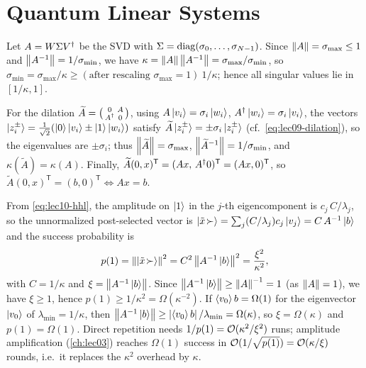 \chapter{Quantum Linear Systems}

\begin{solution}
Let $A=W\Sigma V^{\dagger}$ be the SVD with $\Sigma=\operatorname{diag}(\sigma_0,\dots,\sigma_{N-1})$. Since
$\left\lVert A \right\rVert=\sigma_{\max}\le1$ and $\left\lVert A^{-1} \right\rVert=1/\sigma_{\min}$, we have
$\kappa=\left\lVert A \right\rVert\left\lVert A^{-1} \right\rVert=\sigma_{\max}/\sigma_{\min}$, so $\sigma_{\min}
=\sigma_{\max}/\kappa\ge(\text{after rescaling }\sigma_{\max}=1)\ 1/\kappa$; hence all
singular values lie in $[1/\kappa,1]$.

For the dilation $\widetilde A=\bigl(\begin{smallmatrix}0&A\\ A^{\dagger}&0\end{smallmatrix}
\bigr)$, using $A\ket{v_i}=\sigma_i\ket{w_i}$, $A^{\dagger}\ket{w_i}=\sigma_i\ket{v_i}$, the
vectors $\ket{z_i^\pm}=\tfrac1{\sqrt2}(\ket0\ket{v_i}\pm\ket1\ket{w_i})$ satisfy
$\widetilde A\ket{z_i^\pm}=\pm\sigma_i\ket{z_i^\pm}$ (cf.\ \eqref{eq:lec09-dilation}), so
the eigenvalues are $\pm\sigma_i$; thus $\left\lVert \widetilde A \right\rVert=\sigma_{\max}$,
$\left\lVert \widetilde A^{-1} \right\rVert=1/\sigma_{\min}$, and $\kappa(\widetilde A)=\kappa(A)$.
Finally, $\widetilde A(0,x)^{\mathsf T}=(Ax,\,A^{\dagger} 0)^{\mathsf T}=(Ax,0)^{\mathsf T}$, so
$\widetilde A(0,x)^{\mathsf T}=(b,0)^{\mathsf T}\iff Ax=b$.
\end{solution}

\begin{solution}
From \eqref{eq:lec10-hhl}, the amplitude on $\ket1$ in the $j$-th eigencomponent is
$c_j\,C/\lambda_j$, so the unnormalized post-selected vector is
$\ket{\tilde x\!\succ}=\sum_j (C/\lambda_j)c_j\ket{v_j}=C\,A^{-1}\ket b$ and the success
probability is
\[
  p(1)=\left\lVert \ket{\tilde x\!\succ} \right\rVert^2=C^2\left\lVert A^{-1}\ket b \right\rVert^2
      =\frac{\xi^2}{\kappa^2},
\]
with $C=1/\kappa$ and $\xi=\left\lVert A^{-1}\ket b \right\rVert$. Since $\left\lVert A^{-1}\ket b \right\rVert\ge
\left\lVert A \right\rVert^{-1}=1$ (as $\left\lVert A \right\rVert=1$), we have $\xi\ge1$, hence $p(1)\ge1/\kappa^2
=\Omega(\kappa^{-2})$. If $\braket{v_0}{b}=\Omega(1)$ for the eigenvector $\ket{v_0}$ of
$\lambda_{\min}=1/\kappa$, then $\left\lVert A^{-1}\ket b \right\rVert\ge\left\lvert \braket{v_0}{b} \right\rvert/\lambda_{\min}
=\Omega(\kappa)$, so $\xi=\Omega(\kappa)$ and $p(1)=\Omega(1)$. Direct repetition needs
$1/p(1)=\mathcal{O}(\kappa^2/\xi^2)$ runs; amplitude amplification (\cref{ch:lec03}) reaches
$\Omega(1)$ success in $\mathcal{O}(1/\sqrt{p(1)})=\mathcal{O}(\kappa/\xi)$ rounds, i.e.\ it replaces
the $\kappa^2$ overhead by $\kappa$.
\end{solution}

